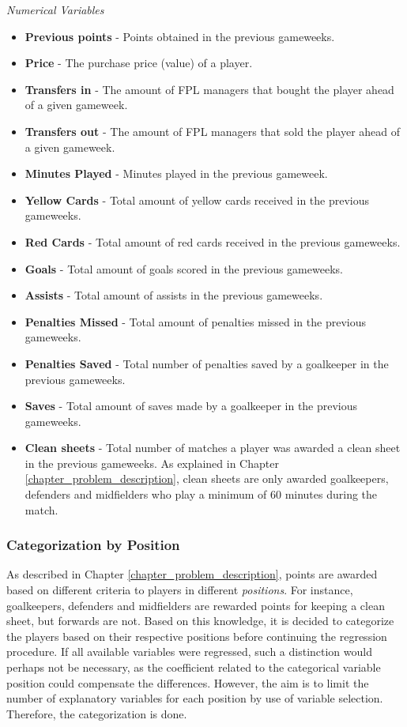 \textit{Numerical Variables}
\newpar
\begin{itemize}
    \item \textbf{Previous points} - Points obtained in the previous gameweeks.
    \item \textbf{Price} - The purchase price (value) of a player.
    \item \textbf{Transfers in} - The amount of FPL managers that bought the player ahead of a given gameweek.
    \item \textbf{Transfers out} - The amount of FPL managers that sold the player ahead of a given gameweek.
    \item \textbf{Minutes Played} - Minutes played in the previous gameweek.
    \item \textbf{Yellow Cards} - Total amount of yellow cards received in the previous gameweeks.
    \item \textbf{Red Cards} - Total amount of red cards received in the previous gameweeks.
    \item \textbf{Goals} - Total amount of goals scored in the previous gameweeks.
    \item \textbf{Assists} - Total amount of assists in the previous gameweeks.
    \item \textbf{Penalties Missed} - Total amount of penalties missed in the previous gameweeks.
    \item \textbf{Penalties Saved} - Total number of penalties saved by a goalkeeper in the previous gameweeks.
    \item \textbf{Saves} - Total amount of saves made by a goalkeeper in the previous gameweeks.
    \item \textbf{Clean sheets} - Total number of matches a player was awarded a clean sheet in the previous gameweeks. As explained in Chapter \ref{chapter_problem_description}, clean sheets are only awarded goalkeepers, defenders and midfielders who play a minimum of 60 minutes during the match.
    
\end{itemize}

\subsubsection{Categorization by Position}


As described in Chapter \ref{chapter_problem_description}, points are awarded based on different criteria to players in different \textit{positions}. For instance, goalkeepers, defenders and midfielders are rewarded points for keeping a clean sheet, but forwards are not. Based on this knowledge, it is decided to categorize the players based on their respective positions before continuing the regression procedure. If all available variables were regressed, such a distinction would perhaps not be necessary, as the coefficient related to the categorical variable position could compensate the differences. However, the aim is to limit the number of explanatory variables for each position by use of variable selection. Therefore, the categorization is done. 

